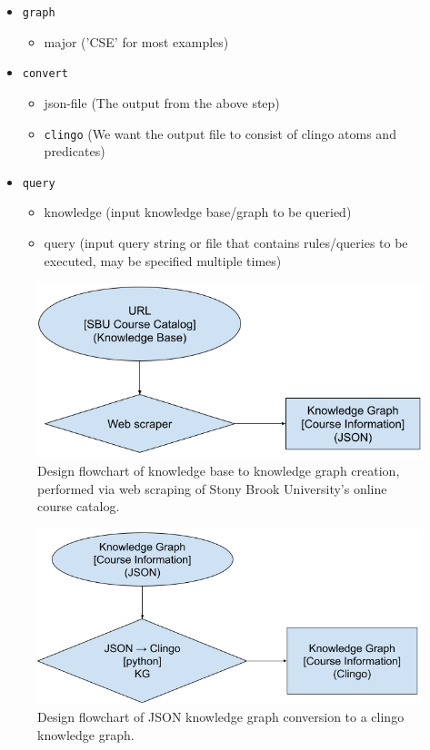 \documentclass[12pt]{article}
\begin{document}
    \begin{itemize}
        \item {\tt{graph}}
        \begin{itemize}
            \item major ('CSE' for most examples)
        \end{itemize}
        \item {\tt{convert}}
        \begin{itemize}
            \item json-file (The output from the above step)
            \item {\tt{clingo}} (We want the output file to consist of clingo atoms and predicates)
        \end{itemize}
        \item {\tt{query}}
        \begin{itemize}
            \item knowledge (input knowledge base/graph to be queried) 
            \item query (input query string or file that contains rules/queries to be executed, may be specified multiple times)
        \end{itemize}
    \end{itemize}

    \begin{figure}
        \centering
        \includegraphics[scale=0.5]{figures/design/kb_to_kg_json.png}
        \caption{Design flowchart of knowledge base to knowledge graph creation, performed via web scraping of Stony Brook University's online course catalog.}
        \label{fig:kb-kg}
    \end{figure}

    \begin{figure}
        \centering
        \includegraphics[scale=0.5]{figures/design/json_to_clingo_kg.png}
        \caption{Design flowchart of JSON knowledge graph conversion to a clingo knowledge graph.}
        \label{fig:kg-clingo}
    \end{figure}
\end{document}
